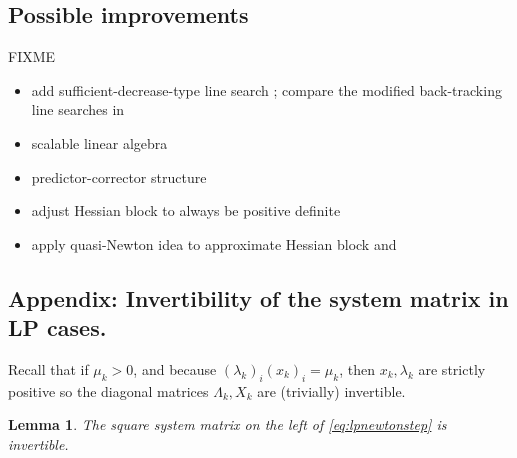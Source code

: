 \documentclass[11pt]{article}
\begin{document}


\subsection*{Possible improvements}

FIXME
\begin{itemize}
\item add sufficient-decrease-type line search \cite[sections 19.3, 19.4]{NocedalWright2006}; compare the modified back-tracking line searches in \cite{BensonMunson2006}
\item scalable linear algebra
\item predictor-corrector structure \cite[section 14.2]{NocedalWright2006}
\item adjust Hessian block to always be positive definite \cite[section 11.4]{GrivaNashSofer2009}
\item apply quasi-Newton idea to approximate Hessian block \cite[sections 12.3, 13.5]{GrivaNashSofer2009} and \cite[section 19.3]{NocedalWright2006}
\end{itemize}


\medskip




\appendix
\subsection*{Appendix: Invertibility of the system matrix in LP cases.}

\newtheorem*{lemma}{Lemma}

Recall that if $\mu_k>0$, and because $(\lambda_k)_i (x_k)_i = \mu_k$, then $x_k,\lambda_k$ are strictly positive so the diagonal matrices $\Lambda_k,X_k$ are (trivially) invertible.

\begin{lemma}
The square system matrix on the left of \eqref{eq:lpnewtonstep} is invertible.
\end{lemma}
\end{document}
